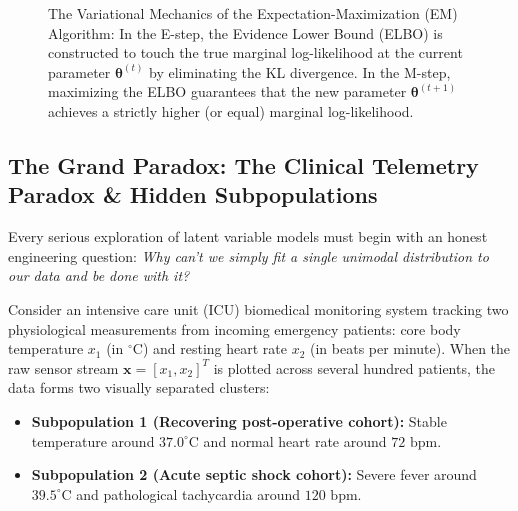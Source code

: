\begin{figure}[htbp]
\caption{The Variational Mechanics of the Expectation-Maximization (EM) Algorithm: In the E-step, the Evidence Lower Bound (ELBO) is constructed to touch the true marginal log-likelihood at the current parameter $\boldsymbol{\theta}^{(t)}$ by eliminating the KL divergence. In the M-step, maximizing the ELBO guarantees that the new parameter $\boldsymbol{\theta}^{(t+1)}$ achieves a strictly higher (or equal) marginal log-likelihood.}
\label{fig:em_elbo_ascent}
\end{figure}

\subsection{The Grand Paradox: The Clinical Telemetry Paradox \& Hidden Subpopulations}
Every serious exploration of latent variable models must begin with an honest engineering question: \emph{Why can't we simply fit a single unimodal distribution to our data and be done with it?}

Consider an intensive care unit (ICU) biomedical monitoring system tracking two physiological measurements from incoming emergency patients: core body temperature $x_1$ (in $^\circ\text{C}$) and resting heart rate $x_2$ (in beats per minute). When the raw sensor stream $\mathbf{x} = [x_1, x_2]^T$ is plotted across several hundred patients, the data forms two visually separated clusters:
\begin{itemize}
    \item \textbf{Subpopulation 1 (Recovering post-operative cohort):} Stable temperature around $37.0^\circ\text{C}$ and normal heart rate around $72\text{ bpm}$.
    \item \textbf{Subpopulation 2 (Acute septic shock cohort):} Severe fever around $39.5^\circ\text{C}$ and pathological tachycardia around $120\text{ bpm}$.
\end{itemize}

